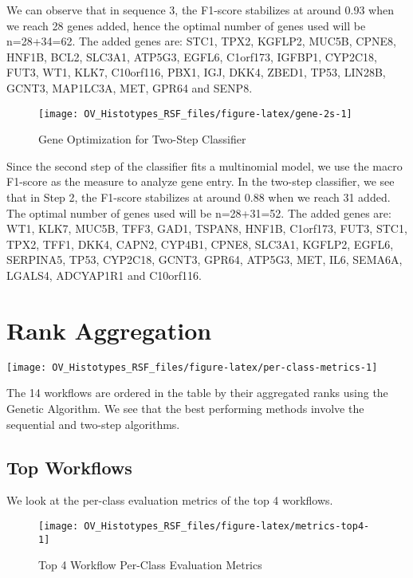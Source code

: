 \documentclass[
]{report}
\begin{document}
We can observe that in sequence 3, the F1-score stabilizes at around 0.93 when we reach 28 genes added, hence the optimal number of genes used will be n=28+34=62. The added genes are: STC1, TPX2, KGFLP2, MUC5B, CPNE8, HNF1B, BCL2, SLC3A1, ATP5G3, EGFL6, C1orf173, IGFBP1, CYP2C18, FUT3, WT1, KLK7, C10orf116, PBX1, IGJ, DKK4, ZBED1, TP53, LIN28B, GCNT3, MAP1LC3A, MET, GPR64 and SENP8.

\begin{figure}[H]

{\centering \texttt{[image: OV\_Histotypes\_RSF\_files/figure-latex/gene-2s-1]} 

}

\caption{Gene Optimization for Two-Step Classifier}\label{fig:gene-2s}
\end{figure}

Since the second step of the classifier fits a multinomial model, we use the macro F1-score as the measure to analyze gene entry. In the two-step classifier, we see that in Step 2, the F1-score stabilizes at around 0.88 when we reach 31 added. The optimal number of genes used will be n=28+31=52. The added genes are: WT1, KLK7, MUC5B, TFF3, GAD1, TSPAN8, HNF1B, C1orf173, FUT3, STC1, TPX2, TFF1, DKK4, CAPN2, CYP4B1, CPNE8, SLC3A1, KGFLP2, EGFL6, SERPINA5, TP53, CYP2C18, GCNT3, GPR64, ATP5G3, MET, IL6, SEMA6A, LGALS4, ADCYAP1R1 and C10orf116.

\hypertarget{rank-aggregation}{%
\section{Rank Aggregation}\label{rank-aggregation}}

\begin{center}\texttt{[image: OV\_Histotypes\_RSF\_files/figure-latex/per-class-metrics-1]} \end{center}

The 14 workflows are ordered in the table by their aggregated ranks using the Genetic Algorithm. We see that the best performing methods involve the sequential and two-step algorithms.

\hypertarget{top-workflows}{%
\subsection{Top Workflows}\label{top-workflows}}

We look at the per-class evaluation metrics of the top 4 workflows.

\begin{figure}[H]

{\centering \texttt{[image: OV\_Histotypes\_RSF\_files/figure-latex/metrics-top4-1]} 

}

\caption{Top 4 Workflow Per-Class Evaluation Metrics}\label{fig:metrics-top4}
\end{figure}
\end{document}
